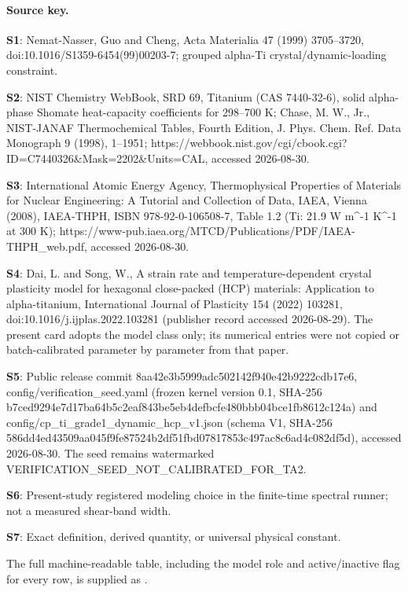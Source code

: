 \paragraph{Source key.}
\textbf{S1}: Nemat-Nasser, Guo and Cheng, Acta Materialia 47 (1999) 3705--3720, doi:10.1016/S1359-6454(99)00203-7; grouped alpha-Ti crystal/dynamic-loading constraint.\par
\textbf{S2}: NIST Chemistry WebBook, SRD 69, Titanium (CAS 7440-32-6), solid alpha-phase Shomate heat-capacity coefficients for 298--700 K; Chase, M. W., Jr., NIST-JANAF Thermochemical Tables, Fourth Edition, J. Phys. Chem. Ref. Data Monograph 9 (1998), 1--1951; https://webbook.nist.gov/cgi/cbook.cgi?ID=C7440326\&Mask=2202\&Units=CAL, accessed 2026-08-30.\par
\textbf{S3}: International Atomic Energy Agency, Thermophysical Properties of Materials for Nuclear Engineering: A Tutorial and Collection of Data, IAEA, Vienna (2008), IAEA-THPH, ISBN 978-92-0-106508-7, Table 1.2 (Ti: 21.9 W m\textasciicircum{}-1 K\textasciicircum{}-1 at 300 K); https://www-pub.iaea.org/MTCD/Publications/PDF/IAEA-THPH\_web.pdf, accessed 2026-08-30.\par
\textbf{S4}: Dai, L. and Song, W., A strain rate and temperature-dependent crystal plasticity model for hexagonal close-packed (HCP) materials: Application to alpha-titanium, International Journal of Plasticity 154 (2022) 103281, doi:10.1016/j.ijplas.2022.103281 (publisher record accessed 2026-08-29). The present card adopts the model class only; its numerical entries were not copied or batch-calibrated parameter by parameter from that paper.\par
\textbf{S5}: Public release commit 8aa42e3b5999adc502142f940e42b9222cdb17e6, config/verification\_seed.yaml (frozen kernel version 0.1, SHA-256 b7ced9294e7d17ba64b5c2eaf843be5eb4defbcfe480bbb04bce1fb8612c124a) and config/cp\_ti\_grade1\_dynamic\_hcp\_v1.json (schema V1, SHA-256 586dd4ed43509aa045f9fe87524b2df51fbd07817853c497ac8c6ad4c082df5d), accessed 2026-08-30. The seed remains watermarked VERIFICATION\_SEED\_NOT\_CALIBRATED\_FOR\_TA2.\par
\textbf{S6}: Present-study registered modeling choice in the finite-time spectral runner; not a measured shear-band width.\par
\textbf{S7}: Exact definition, derived quantity, or universal physical constant.\par

The full machine-readable table, including the model role and active/inactive flag for every row, is supplied as .
